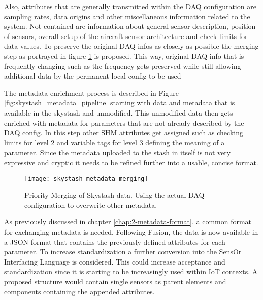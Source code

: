 Also, attributes that are generally transmitted within the DAQ configuration are sampling rates, data origins and other miscellaneous information related to the system. Not contained are information about general sensor description, position of sensors, overall setup of the aircraft sensor architecture and check limits for data values. To preserve the original DAQ infos as closely as possible the merging step as portrayed in figure \ref{fig:skystash_metadata_merging} is proposed. This way, original DAQ info that is frequently changing such as the frequency gets preserved while still allowing additional data by the permanent local config to be used

The metadata enrichment process is described in Figure \ref{fig:skystash_metadata_pipeline} starting with data and metadata that is available in the skystash and unmodified. This unmodified data then gets enriched with metadata for parameters that are not already described by the DAQ config. In this step other SHM attributes get assigned such as checking limits for level 2 and variable tags for level 3 defining the meaning of a parameter. Since the metadata uploaded to the stash in itself is not very expressive and cryptic it needs to be refined further into a usable, concise format.
\begin{figure}
    \centering
    \texttt{[image: skystash\_metadata\_merging]}
    \caption{Priority Merging of Skystash data. Using the actual-DAQ configuration to overwrite other metadata.}
    \label{fig:skystash_metadata_merging}
\end{figure}


As previously discussed in chapter \ref{chap:2-metadata-format}, a common format for exchanging metadata is needed. Following Fusion, the data is now available in a JSON format that contains the previously defined attributes for each parameter. To increase standardization a further conversion into the SensOr Interfacing Language is considered. This could increase acceptance and standardization since it is starting to be increasingly used within IoT contexts. A proposed structure would contain single sensors as parent elements and components containing the appended attributes. \cite{behrens_domain-specific_2021}

